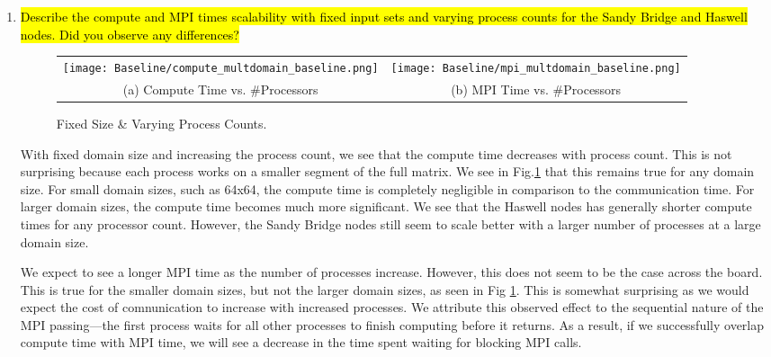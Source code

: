 \begin{enumerate}
	Overall, this seems to indicate that, within these constraints, the Haswell nodes will perform slightly better. However, these results also imply that the Sandy Bridge nodes may scale better with a larger domain size and an increased process count (assuming that the chosen process count is suitable for the given domain size). 

	\item \hl{Describe the compute and MPI times scalability with fixed input sets and varying process counts for the Sandy Bridge and Haswell nodes. Did you observe any differences?}

	\begin{figure}[h] %
		\begin{tabular}{cc}
			\hspace*{-0.35\linewidth}\texttt{[image: Baseline/compute\_multdomain\_baseline.png]} & \hspace*{-0.05\linewidth}\texttt{[image: Baseline/mpi\_multdomain\_baseline.png]} \\
			\hspace*{-0.45\linewidth}(a) Compute Time vs. \#Processors & \hspace*{-0.15\linewidth}(b) MPI Time vs. \#Processors\\[6pt]
		\end{tabular}
		\caption{Fixed Size \& Varying Process Counts.}
		\label{fig:varying_domain}
	\end{figure}


With fixed domain size and increasing the process count, we see that the compute time decreases with process count. This is not surprising because each process works on a smaller segment of the full matrix. We see in Fig.\ref{fig:varying_domain} that this remains true for any domain size. For small domain sizes, such as 64x64, the compute time is completely negligible in comparison to the communication time. For larger domain sizes, the compute time becomes much more significant. We see that the Haswell nodes has generally shorter compute times for any processor count. However, the Sandy Bridge nodes still seem to scale better with a larger number of processes at a large domain size.

We expect to see a longer MPI time as the number of processes increase. However, this does not seem to be the case across the board. This is true for the smaller domain sizes, but not the larger domain sizes, as seen in Fig \ref{fig:varying_domain}. This is somewhat surprising as we would expect the cost of comnunication to increase with increased processes. We attribute this observed effect to the sequential nature of the MPI passing---the first process waits for all other processes to finish computing before it returns. As a result, if we successfully overlap compute time with MPI time, we will see a decrease in the time spent waiting for blocking MPI calls.


\end{enumerate}
